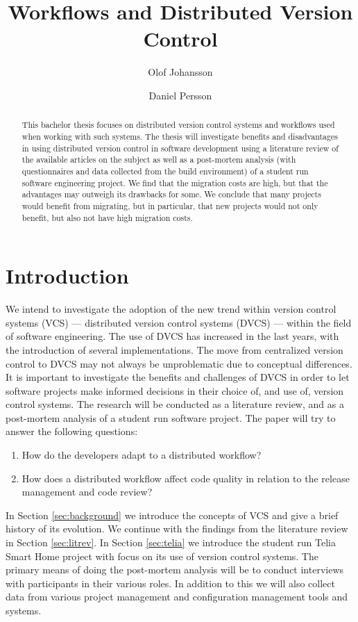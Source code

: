\documentclass{llncs}
\title{Workflows and Distributed Version Control}
\author{Olof Johansson \and Daniel Persson}
\institute{Blekinge Institute of Technology}
\begin{document}
\maketitle

\begin{abstract}
 This bachelor thesis focuses on distributed version control systems
 and workflows used when working with such systems. The thesis will
 investigate benefits and disadvantages in using distributed version
 control in software development using a literature review of the
 available articles on the subject as well as a post-mortem analysis
 (with questionnaires and data collected from the build environment) 
 of a student run software engineering project. We find that the
 migration costs are high, but that the advantages may outweigh its
 drawbacks for some. We conclude that many projects would benefit from
 migrating, but in particular, that new projects would not only
 benefit, but also not have high migration costs.
\end{abstract}

\section{Introduction}

We intend to investigate the adoption of the new trend within version
control systems (VCS) --- distributed version control systems (DVCS)
--- within the field of software engineering. The use of DVCS has
increased in the last years, with the introduction of several
implementations. The move from centralized version control to DVCS may
not always be unproblematic due to conceptual differences. It is
important to investigate the benefits and challenges of DVCS in order
to let software projects make informed decisions in their choice of,
and use of, version control systems. The research will be conducted as
a literature review, and as a post-mortem analysis of a student run
software project. The paper will try to answer the following questions:

\begin{enumerate}
 \item How do the developers adapt to a distributed workflow?
 \item How does a distributed workflow affect code quality in relation
       to the release management and code review?
\end{enumerate}

In Section \ref{sec:background} we introduce the concepts of VCS and
give a brief history of its evolution. We continue with the findings
from the literature review in Section \ref{sec:litrev}. In Section
\ref{sec:telia} we introduce the student run Telia Smart Home project
with focus on its use of version control systems. The primary means of
doing the post-mortem analysis will be to conduct interviews with
participants in their various roles. In addition to this we will also
collect data from various project management and configuration
management tools and systems.
\end{document}
